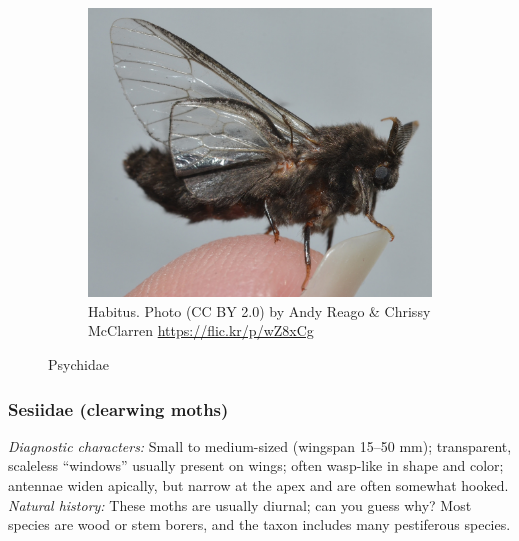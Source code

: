 \documentclass[letterpaper, 11pt]{article}
\begin{document}
\begin{figure}[ht!]
\begin{subfigure}[ht!]{0.35\textwidth}
        \includegraphics[width=\textwidth]{PsychidHabitus}
        \caption{Habitus. Photo (CC BY 2.0) by Andy Reago \& Chrissy McClarren \url{https://flic.kr/p/wZ8xCg}}
        \label{fig:psychid3}
    \end{subfigure}
    \caption{Psychidae}\label{fig:psychids}
\end{figure}

\subsubsection{Sesiidae (clearwing moths)}
\noindent{}\textit{Diagnostic characters:} Small to medium-sized (wingspan 15--50 mm); transparent, scaleless ``windows'' usually present on wings; often wasp-like in shape and color; antennae widen apically, but narrow at the apex and are often somewhat hooked.\\

\noindent{}\textit{Natural history:} These moths are usually diurnal; can you guess why? Most species are wood or stem borers, and the taxon includes many pestiferous species.
\end{document}
